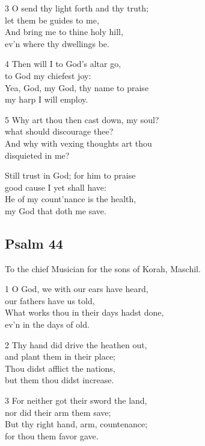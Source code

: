 \begin{multicols}{3}
3 O send thy light forth and thy truth;\\
let them be guides to me,\\
And bring me to thine holy hill,\\
ev’n where thy dwellings be.

4 Then will I to God’s altar go,\\
to God my chiefest joy:\\
Yea, God, my God, thy name to praise\\
my harp I will employ.

5 Why art thou then cast down, my soul?\\
what should discourage thee?\\
And why with vexing thoughts art thou\\
disquieted in me?

Still trust in God; for him to praise\\
good cause I yet shall have:\\
He of my count’nance is the health,\\
my God that doth me save.

\begin{center}
\quad{}\quad{}
\end{center}

\subsection*{Psalm 44}

To the chief Musician
for the sons of Korah, Maschil.

1 O God, we with our ears have heard,\\
our fathers have us told,\\
What works thou in their days hadst done,\\
ev’n in the days of old.

2 Thy hand did drive the heathen out,\\
and plant them in their place;\\
Thou didst afflict the nations,\\
but them thou didst increase.

3 For neither got their sword the land,\\
nor did their arm them save;\\
But thy right hand, arm, countenance;\\
for thou them favor gave.


\end{multicols}
